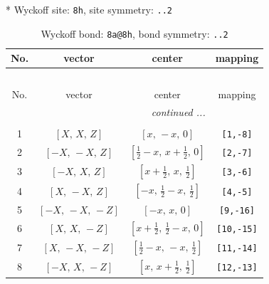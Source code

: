 \documentclass[fleqn,8pt]{jsarticle}
\begin{document}
* Wyckoff site: {\tt 8h}, site symmetry: {\tt ..2}
\renewcommand{\arraystretch}{1.2}
\begin{longtable}{cccc}
\caption{Wyckoff bond: {\tt 8a@8h}, bond symmetry: {\tt ..2}}
 \\
 \hline \hline
No. & vector & center & mapping \\ \hline \endfirsthead

\multicolumn{3}{l}{\tablename\ \thetable{}} \\
 \hline \hline
No. & vector & center & mapping \\ \hline \endhead

 \hline \hline
\multicolumn{3}{r}{\footnotesize\it continued ...} \\ \endfoot

 \hline \hline
\multicolumn{3}{r}{} \\ \endlastfoot

1 & $\left[ X,\, X,\, Z \right]$ & $\left[ x,\, - x,\, 0 \right]$ & {\tt [1,-8]} \\ \hline
2 & $\left[ - X,\, - X,\, Z \right]$ & $\left[ \frac{1}{2} - x,\, x + \frac{1}{2},\, 0 \right]$ & {\tt [2,-7]} \\ \hline
3 & $\left[ - X,\, X,\, Z \right]$ & $\left[ x + \frac{1}{2},\, x,\, \frac{1}{2} \right]$ & {\tt [3,-6]} \\ \hline
4 & $\left[ X,\, - X,\, Z \right]$ & $\left[ - x,\, \frac{1}{2} - x,\, \frac{1}{2} \right]$ & {\tt [4,-5]} \\ \hline
5 & $\left[ - X,\, - X,\, - Z \right]$ & $\left[ - x,\, x,\, 0 \right]$ & {\tt [9,-16]} \\ \hline
6 & $\left[ X,\, X,\, - Z \right]$ & $\left[ x + \frac{1}{2},\, \frac{1}{2} - x,\, 0 \right]$ & {\tt [10,-15]} \\ \hline
7 & $\left[ X,\, - X,\, - Z \right]$ & $\left[ \frac{1}{2} - x,\, - x,\, \frac{1}{2} \right]$ & {\tt [11,-14]} \\ \hline
8 & $\left[ - X,\, X,\, - Z \right]$ & $\left[ x,\, x + \frac{1}{2},\, \frac{1}{2} \right]$ & {\tt [12,-13]} \\
\end{longtable}
\renewcommand{\arraystretch}{1.2}
\end{document}
